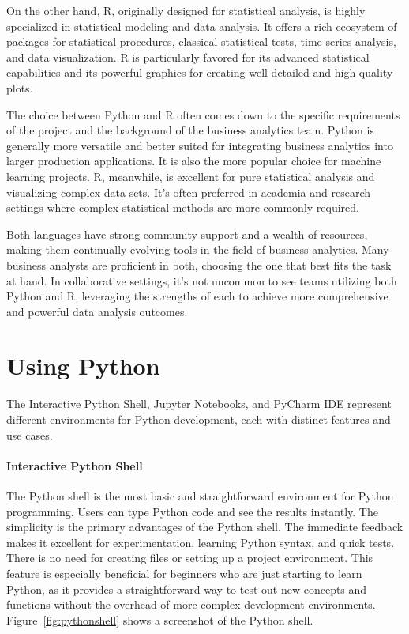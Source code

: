 On the other hand, R, originally designed for statistical analysis, is highly specialized in statistical modeling and data analysis. It offers a rich ecosystem of packages for statistical procedures, classical statistical tests, time-series analysis, and data visualization. R is particularly favored for its advanced statistical capabilities and its powerful graphics for creating well-detailed and high-quality plots.

The choice between Python and R often comes down to the specific requirements of the project and the background of the business analytics team. Python is generally more versatile and better suited for integrating business analytics into larger production applications. It is also the more popular choice for machine learning projects. R, meanwhile, is excellent for pure statistical analysis and visualizing complex data sets. It's often preferred in academia and research settings where complex statistical methods are more commonly required.

Both languages have strong community support and a wealth of resources, making them continually evolving tools in the field of business analytics. Many business analysts are proficient in both, choosing the one that best fits the task at hand. In collaborative settings, it's not uncommon to see teams utilizing both Python and R, leveraging the strengths of each to achieve more comprehensive and powerful data analysis outcomes.

\section{Using Python}

The Interactive Python Shell, Jupyter Notebooks, and PyCharm IDE represent different environments for Python development, each with distinct features and use cases.

\paragraph*{Interactive Python Shell} The Python shell is the most basic and straightforward environment for Python programming. Users can type Python code and see the results instantly. The simplicity is the primary advantages of the Python shell. The immediate feedback makes it excellent for experimentation, learning Python syntax, and quick tests. There is no need for creating files or setting up a project environment. This feature is especially beneficial for beginners who are just starting to learn Python, as it provides a straightforward way to test out new concepts and functions without the overhead of more complex development environments. Figure~\ref{fig:pythonshell} shows a screenshot of the Python shell.

